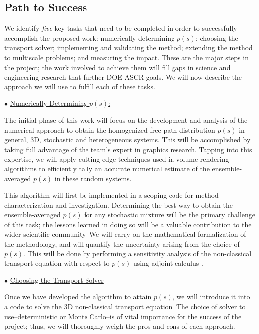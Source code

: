 \documentclass[12pt]{article}
\begin{document}
\subsection{Path to Success}

We identify \textit{five} key tasks that need to be completed in order to successfully accomplish the proposed work: numerically determining $p(s)$; choosing the transport solver; implementing and validating the method; extending the method to multiscale problems; and measuring the impact.
These are the major steps in the project; the work involved to achieve them will fill gaps in science and engineering research that further DOE-ASCR goals.
We will now describe the approach we will use to fulfill each of these tasks.

$\bullet$ \underline{Numerically Determining $p(s)$:}

The initial phase of this work will focus on the development and analysis of the numerical approach to obtain the homogenized free-path distribution $p(s)$ in general, 3D, stochastic and heterogeneous systems.
This will be accomplished by taking full advantage of the team's expert in graphics research.
Tapping into this expertise, we will apply cutting-edge techniques used in volume-rendering algorithms to efficiently tally an accurate numerical estimate of the ensemble-averaged $p(s)$ in these random systems.

This algorithm will first be implemented in a scoping code for method characterization and investigation.
Determining the best way to obtain the ensemble-averaged $p(s)$ for any stochastic mixture will be the primary challenge of this task; the lessons learned in doing so will be a valuable contribution to the wider scientific community.
We will carry on the mathematical formalization of the methodology, and will quantify the uncertainty arising from the choice of $p(s)$.
This will be done by performing a sensitivity analysis of the non-classical transport equation with respect to $p(s)$ using adjoint calculus \cite{barfra16,cac03}. 

$\bullet$ \underline{Choosing the Transport Solver}

Once we have developed the algorithm to attain $p(s)$, we will introduce it into a code to solve the 3D non-classical transport equation.
The choice of solver to use--deterministic or Monte Carlo--is of vital importance for the success of the project; thus, we will thoroughly weigh the pros and cons of each approach.
\end{document}
